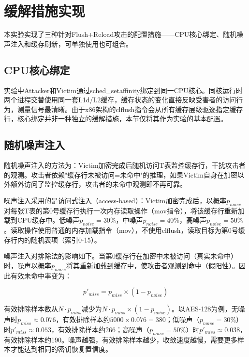 \section{缓解措施实现}

本实验实现了三种针对Flush+Reload攻击的配置措施——CPU核心绑定、随机噪声注入和缓存刷新，可单独使用也可组合。

\subsection{CPU核心绑定}

实验中Attacker和Victim通过sched\_setaffinity绑定到同一CPU核心。同核运行时两个进程交替使用同一套L1d/L2缓存，缓存状态的变化直接反映受害者的访问行为，测量信号最清晰。由于x86架构的clflush指令会从所有缓存层级驱逐指定缓存行，核心绑定并非一种独立的缓解措施，本节仅将其作为实验的基本配置。

\subsection{随机噪声注入}

随机噪声注入的方法为：Victim加密完成后随机访问T表监控缓存行，干扰攻击者的观测。攻击者依赖"缓存行未被访问=未命中"的推理，如果Victim自身在加密以外额外访问了监控缓存行，攻击者的未命中观测即不再可靠。

噪声注入采用的是访问式注入（access-based）：Victim加密完成后，以概率$p_{noise}$对每张T表的第0号缓存行执行一次内存读取操作（mov指令），将该缓存行重新加载到CPU缓存中。低噪声$p_{noise} = 30\%$，中噪声$p_{noise} = 40\%$，高噪声$p_{noise} = 50\%$。读取操作使用普通的内存加载指令（mov），不使用clflush，读取目标为第0号缓存行内的随机表项（索引0-15）。

噪声注入对排除法的影响如下。当第0缓存行在加密中未被访问（真实未命中）时，噪声以概率$p_{noise}$将其重新加载到缓存中，使攻击者观测到命中（假阳性）。因此有效未命中率变为：

\begin{equation}
p'_{miss} = p_{miss} \times (1 - p_{noise})
\end{equation}

有效排除样本数从$N \cdot p_{miss}$减少为$N \cdot p_{miss} \times (1 - p_{noise})$。以AES-128为例，无噪声时$p_{miss} \approx 0.076$，有效排除样本约$5000 \times 0.076 = 380$；低噪声（$p_{noise} = 30\%$）时$p'_{miss} \approx 0.053$，有效排除样本约266；高噪声（$p_{noise} = 50\%$）时$p'_{miss} \approx 0.038$，有效排除样本约190。噪声越强，有效排除样本越少，收敛速度越慢，需要更多样本才能达到相同的密钥恢复置信度。

